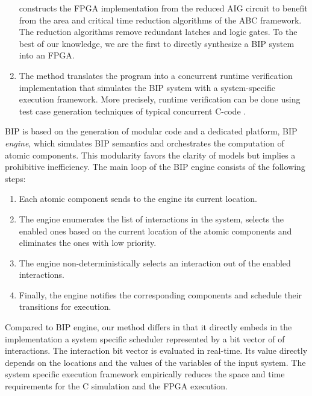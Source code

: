 \begin{enumerate}
  \biptool{} constructs the FPGA implementation from the reduced AIG circuit 
  to benefit from the area and critical time reduction algorithms 
  of the ABC framework. 
  The reduction algorithms remove redundant latches and logic gates.  
  To the best of our knowledge, we are the first to directly synthesize a BIP system into an FPGA. 

\item The method translates the \caig program into a concurrent runtime verification 
  implementation that simulates the BIP 
  system with a system-specific execution framework. More precisely, runtime verification can be done using 
test case generation techniques of typical concurrent C-code \cite{kbse-BurnimS08}.
\end{enumerate}


BIP is based on the generation of modular code and a dedicated platform, BIP \emph{engine}, which simulates BIP semantics and orchestrates the computation of atomic components. This modularity favors the clarity of models but implies a prohibitive inefficiency. The main loop of the BIP engine consists of the following steps:
%
\begin{enumerate}
\item Each atomic component sends to the engine its current location.
\item The engine enumerates the list of interactions in the system, 
  selects the enabled ones based on the current location of the atomic 
  components and eliminates the ones with low priority.
\item The engine non-deterministically selects an interaction out of the enabled interactions.
\item Finally, the engine notifies the corresponding components and schedule their transitions for execution. 
\end{enumerate}
%
Compared to BIP engine, our method differs in that it directly embeds in the implementation a system specific scheduler represented by a bit vector of of interactions.
The interaction bit vector is evaluated in real-time.
Its value directly depends on the locations and the values of the variables of the input system. 
The system specific execution framework empirically reduces the space and time requirements for the C simulation and the FPGA execution. 


